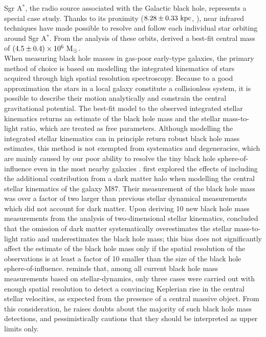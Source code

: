 Sgr A$^*$, the radio source associated with the Galactic black hole, represents a special case study. 
Thanks to its proximity ($8.28 \pm 0.33 \rm~kpc$, \citealt{genzel2010}), 
near infrared techniques have made possible to resolve and follow each individual star 
orbiting around Sgr A$^*$. 
From the analysis of these orbits, 
\citet{ghez2008} derived a best-fit central mass of $(4.5 \pm 0.4) \times 10^6 \rm~M_\odot$. \\

When measuring black hole masses in gas-poor early-type galaxies, 
the primary method of choice is based on modelling the integrated kinematics of stars 
acquired through high spatial resolution spectroscopy. 
Because to a good approximation the stars in a local galaxy constitute a collisionless system, 
it is possible to describe their motion analytically and constrain the central gravitational potential. 
The best-fit model to the observed integrated stellar kinematics 
returns an estimate of the black hole mass and the stellar mass-to-light ratio, 
which are treated as free parameters. 
Although modelling the integrated stellar kinematics can in principle return robust black hole mass estimates, 
this method is not exempted from systematics and degeneracies, 
which are mainly caused by our poor ability to resolve the tiny black hole sphere-of-influence even in the most nearby galaxies 
\citep{valluri2004}. 
\citet{gebhardtthomas2009} first explored the effects of including the additional contribution from a dark matter halo 
when modelling the central stellar kinematics of the galaxy M87.
Their measurement of the black hole mass was over a factor of two larger than previous stellar dynamical measurements 
which did not account for dark matter.  
Upon deriving 10 new black hole mass measurements from the analysis of two-dimensional stellar kinematics, 
\citet{rusli2013bhmassesDM} concluded that the omission of dark matter systematically overestimates the stellar mass-to-light ratio 
and underestimates the black hole mass; 
this bias does not significantly affect the estimate of the black hole mass 
only if the spatial resolution of the observations is at least a factor of 10 smaller 
than the size of the black hole sphere-of-influence.
\citet{merritt2013book} reminds that, 
among all current black hole mass measurements based on stellar-dynamics, 
only three cases were carried out with enough spatial resolution to detect 
a convincing Keplerian rise in the central stellar velocities, 
as expected from the presence of a central massive object. 
From this consideration, he raises doubts about the majority of such black hole mass detections, 
and pessimistically cautions that they should be interpreted as upper limits only. \\


